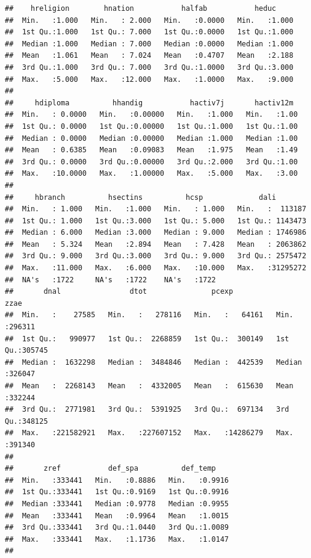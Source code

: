 \documentclass[
]{article}
\begin{document}
\begin{verbatim}
##    hreligion        hnation           halfab           heduc      
##  Min.   :1.000   Min.   : 2.000   Min.   :0.0000   Min.   :1.000  
##  1st Qu.:1.000   1st Qu.: 7.000   1st Qu.:0.0000   1st Qu.:1.000  
##  Median :1.000   Median : 7.000   Median :0.0000   Median :1.000  
##  Mean   :1.061   Mean   : 7.024   Mean   :0.4707   Mean   :2.188  
##  3rd Qu.:1.000   3rd Qu.: 7.000   3rd Qu.:1.0000   3rd Qu.:3.000  
##  Max.   :5.000   Max.   :12.000   Max.   :1.0000   Max.   :9.000  
##                                                                   
##     hdiploma          hhandig           hactiv7j       hactiv12m   
##  Min.   : 0.0000   Min.   :0.00000   Min.   :1.000   Min.   :1.00  
##  1st Qu.: 0.0000   1st Qu.:0.00000   1st Qu.:1.000   1st Qu.:1.00  
##  Median : 0.0000   Median :0.00000   Median :1.000   Median :1.00  
##  Mean   : 0.6385   Mean   :0.09083   Mean   :1.975   Mean   :1.49  
##  3rd Qu.: 0.0000   3rd Qu.:0.00000   3rd Qu.:2.000   3rd Qu.:1.00  
##  Max.   :10.0000   Max.   :1.00000   Max.   :5.000   Max.   :3.00  
##                                                                    
##     hbranch          hsectins          hcsp             dali         
##  Min.   : 1.000   Min.   :1.000   Min.   : 1.000   Min.   :  113187  
##  1st Qu.: 1.000   1st Qu.:3.000   1st Qu.: 5.000   1st Qu.: 1143473  
##  Median : 6.000   Median :3.000   Median : 9.000   Median : 1746986  
##  Mean   : 5.324   Mean   :2.894   Mean   : 7.428   Mean   : 2063862  
##  3rd Qu.: 9.000   3rd Qu.:3.000   3rd Qu.: 9.000   3rd Qu.: 2575472  
##  Max.   :11.000   Max.   :6.000   Max.   :10.000   Max.   :31295272  
##  NA's   :1722     NA's   :1722    NA's   :1722                       
##       dnal                dtot               pcexp               zzae       
##  Min.   :    27585   Min.   :   278116   Min.   :   64161   Min.   :296311  
##  1st Qu.:   990977   1st Qu.:  2268859   1st Qu.:  300149   1st Qu.:305745  
##  Median :  1632298   Median :  3484846   Median :  442539   Median :326047  
##  Mean   :  2268143   Mean   :  4332005   Mean   :  615630   Mean   :332244  
##  3rd Qu.:  2771981   3rd Qu.:  5391925   3rd Qu.:  697134   3rd Qu.:348125  
##  Max.   :221582921   Max.   :227607152   Max.   :14286279   Max.   :391340  
##                                                                             
##       zref           def_spa          def_temp     
##  Min.   :333441   Min.   :0.8886   Min.   :0.9916  
##  1st Qu.:333441   1st Qu.:0.9169   1st Qu.:0.9916  
##  Median :333441   Median :0.9778   Median :0.9955  
##  Mean   :333441   Mean   :0.9964   Mean   :1.0015  
##  3rd Qu.:333441   3rd Qu.:1.0440   3rd Qu.:1.0089  
##  Max.   :333441   Max.   :1.1736   Max.   :1.0147  
## 
\end{verbatim}
\end{document}
